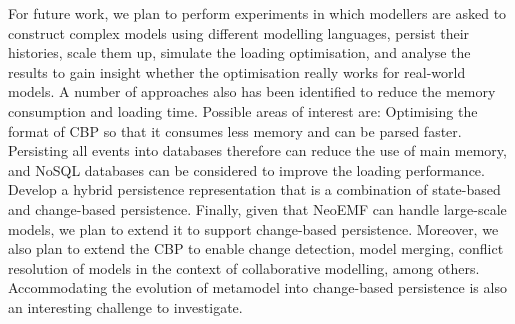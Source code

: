 \documentclass{llncs}
\begin{document}
For future work, we plan to perform experiments in which modellers are asked to construct complex models using different modelling languages, persist their histories, scale them up, simulate the loading optimisation, and analyse the results to gain insight whether the optimisation really works for real-world models. 
A number of approaches also has been identified to reduce the memory consumption and loading time.
Possible areas of interest are:
Optimising the format of CBP so that it consumes less memory and can be parsed faster.
Persisting all events into databases therefore can reduce the use of main memory, and NoSQL databases can be considered to improve the loading performance.
Develop a hybrid persistence representation that is a combination of state-based and change-based persistence.
Finally, given that NeoEMF can handle large-scale models, we plan to extend it to support change-based persistence.
Moreover, we also plan to extend the CBP to enable change detection, model merging, conflict resolution of models in the context of collaborative modelling, among others. 
Accommodating the evolution of metamodel into change-based persistence is also an interesting challenge to investigate.


 

\end{document}
